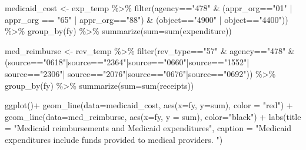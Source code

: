 \documentclass[
  letterpaper,
  DIV=11,
  numbers=noendperiod]{scrreport}
\newenvironment{Shaded}{\begin{snugshade}}{\end{snugshade}}
\newcommand{\AttributeTok}[1]{\textcolor[rgb]{0.40,0.45,0.13}{#1}}
\newcommand{\FunctionTok}[1]{\textcolor[rgb]{0.28,0.35,0.67}{#1}}
\newcommand{\NormalTok}[1]{\textcolor[rgb]{0.00,0.23,0.31}{#1}}
\newcommand{\OtherTok}[1]{\textcolor[rgb]{0.00,0.23,0.31}{#1}}
\newcommand{\SpecialCharTok}[1]{\textcolor[rgb]{0.37,0.37,0.37}{#1}}
\newcommand{\StringTok}[1]{\textcolor[rgb]{0.13,0.47,0.30}{#1}}
\begin{document}
\begin{Shaded}
\begin{Highlighting}[]
\NormalTok{medicaid\_cost }\OtherTok{\textless{}{-}}\NormalTok{ exp\_temp }\SpecialCharTok{\%\textgreater{}\%} 
  \FunctionTok{filter}\NormalTok{(agency}\SpecialCharTok{==}\StringTok{"478"} \SpecialCharTok{\&}\NormalTok{ (appr\_org}\SpecialCharTok{==}\StringTok{"01"} \SpecialCharTok{|}\NormalTok{ appr\_org }\SpecialCharTok{==} \StringTok{"65"} \SpecialCharTok{|}\NormalTok{ appr\_org}\SpecialCharTok{==}\StringTok{"88"}\NormalTok{) }\SpecialCharTok{\&}\NormalTok{ (object}\SpecialCharTok{==}\StringTok{"4900"} \SpecialCharTok{|}\NormalTok{ object}\SpecialCharTok{==}\StringTok{"4400"}\NormalTok{)) }\SpecialCharTok{\%\textgreater{}\%} 
  \FunctionTok{group\_by}\NormalTok{(fy) }\SpecialCharTok{\%\textgreater{}\%} 
  \FunctionTok{summarize}\NormalTok{(}\AttributeTok{sum=}\FunctionTok{sum}\NormalTok{(expenditure))}

\NormalTok{med\_reimburse }\OtherTok{\textless{}{-}}\NormalTok{ rev\_temp }\SpecialCharTok{\%\textgreater{}\%} 
  \FunctionTok{filter}\NormalTok{(rev\_type}\SpecialCharTok{==}\StringTok{"57"} \SpecialCharTok{\&}\NormalTok{ agency}\SpecialCharTok{==}\StringTok{"478"} \SpecialCharTok{\&}\NormalTok{ (source}\SpecialCharTok{==}\StringTok{"0618"}\SpecialCharTok{|}\NormalTok{source}\SpecialCharTok{==}\StringTok{"2364"}\SpecialCharTok{|}\NormalTok{source}\SpecialCharTok{==}\StringTok{"0660"}\SpecialCharTok{|}\NormalTok{source}\SpecialCharTok{==}\StringTok{"1552"}\SpecialCharTok{|}\NormalTok{ source}\SpecialCharTok{==}\StringTok{"2306"}\SpecialCharTok{|}\NormalTok{ source}\SpecialCharTok{==}\StringTok{"2076"}\SpecialCharTok{|}\NormalTok{source}\SpecialCharTok{==}\StringTok{"0676"}\SpecialCharTok{|}\NormalTok{source}\SpecialCharTok{==}\StringTok{"0692"}\NormalTok{)) }\SpecialCharTok{\%\textgreater{}\%} 
  \FunctionTok{group\_by}\NormalTok{(fy) }\SpecialCharTok{\%\textgreater{}\%} 
  \FunctionTok{summarize}\NormalTok{(}\AttributeTok{sum=}\FunctionTok{sum}\NormalTok{(receipts))}



\FunctionTok{ggplot}\NormalTok{()}\SpecialCharTok{+}
  \FunctionTok{geom\_line}\NormalTok{(}\AttributeTok{data=}\NormalTok{medicaid\_cost, }\FunctionTok{aes}\NormalTok{(}\AttributeTok{x=}\NormalTok{fy, }\AttributeTok{y=}\NormalTok{sum), }\AttributeTok{color =} \StringTok{"red"}\NormalTok{) }\SpecialCharTok{+} 
  \FunctionTok{geom\_line}\NormalTok{(}\AttributeTok{data=}\NormalTok{med\_reimburse, }\FunctionTok{aes}\NormalTok{(}\AttributeTok{x=}\NormalTok{fy, }\AttributeTok{y =}\NormalTok{ sum), }\AttributeTok{color=}\StringTok{"black"}\NormalTok{) }\SpecialCharTok{+} 
  \FunctionTok{labs}\NormalTok{(}\AttributeTok{title =} \StringTok{"Medicaid reimbursements and Medicaid expenditures"}\NormalTok{, }
       \AttributeTok{caption =} \StringTok{"Medicaid expenditures include funds provided to medical providers. "}\NormalTok{)}
\end{Highlighting}
\end{Shaded}
\end{document}
